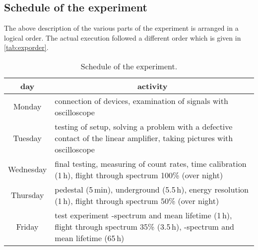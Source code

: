 \subsection{Schedule of the experiment}
The above description of the various parts of the experiment is arranged in a logical order.
The actual execution followed a different order which is given in \autoref{tab:exporder}.

\begin{table}[H]
\caption{Schedule of the experiment.}
\begin{center}
\begin{tabular}{|c|p{12cm}|}
  \hline
  day				&  \multicolumn{1}{|c|}{activity} 		\\ \hline\hline
  Monday			& connection of devices, examination of signals with oscilloscope			\\ \hline
  Tuesday			& testing of setup, solving a problem with a defective contact of the linear amplifier, taking pictures with oscilloscope						\\ \hline
  Wednesday			& final testing, measuring of count rates, time calibration (1\,h), flight through spectrum 100\% (over night)				\\ \hline
  Thursday			& pedestal (5\,min), underground (5.5\,h), energy resolution (1\,h), flight through spectrum 50\% (over night)		\\ \hline
  Friday			& test experiment \textbeta-spectrum and mean lifetime (1\,h), flight through spectrum 35\% (3.5\,h), \textbeta-spectrum and mean lifetime (65\,h)			\\ \hline
 \end{tabular}
\end{center}
\label{tab:exporder}
\end{table}


